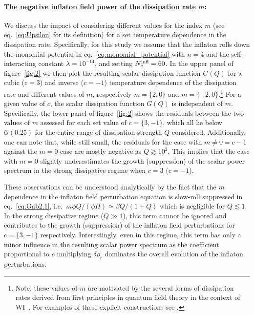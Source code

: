 \documentclass[a4paper,11pt]{article}
\begin{document}
\paragraph{The negative inflaton field power of the dissipation rate $m$:}
We discuss the impact of considering different values for the index $m$ (see eq.~\eqref{eq:Upsilon} for its definition) for a set temperature dependence in the dissipation rate.
Specifically, for this study we assume that the inflaton rolls down the monomial potential in eq.~\eqref{eq:monomial_potential} with $n=4$ and the self-interacting constant $\lambda=10^{-14}$, and setting $N_e^{\rm{infl}} = 60$. In the upper panel of figure~\ref{fig:2} we then plot the resulting scalar dissipation function $G(Q)$ for a cubic ($c=3$) and inverse ($c=-1$) temperature dependence of the dissipation rate and different values of $m$, respectively $m=\{2,0\}$ and $m=\{-2,0\}$.\footnote{Note, these values of $m$ are motivated by the several forms of dissipation rates derived from first principles in quantum field theory in the context of WI~\cite{Kamali:2023lzq}. For examples of these explicit constructions see \cite{Berera:1998gx,Berera:1998px,Bastero-Gil:2012akf,Berghaus:2019whh}.} For a given value of $c$, the scalar dissipation function $G(Q)$ is independent of $m$. Specifically, the lower panel of figure~\ref{fig:2} shows the residuals between the two values of $m$ assessed for each set value of $c=\{3,-1\}$, which all lie below $ \mathcal{O}(0.25)$ for the entire range of dissipation strength $Q$ considered. Additionally, one can note that, while still small, the residuals for the case with $m\neq0=c-1$ against the $m=0$ case are mostly negative as $Q\gtrsim 10^{2}$. This implies that the case with $m=0$ slightly underestimates the growth (suppression) of the scalar power spectrum in the strong dissipative regime when $c=3$ ($c=-1$).

These observations can be understood analytically by the fact that the $m$ dependence in the inflaton field perturbation equation is slow-roll suppressed in eq.~\eqref{eq:Gab2.1}, i.e.\ $m\dot{\phi} Q/(\phi H)\simeq \beta Q/(1+Q)$ which is negligible for $Q\lesssim 1$. In the strong dissipative regime ($Q\gg 1$), this term cannot be ignored and contributes to the growth (suppression) of the inflaton field perturbations for $c=\{3,-1\}$ respectively. Interestingly, even in this regime, this term has only a minor influence in the resulting scalar power spectrum as the coefficient proportional to $c$ multiplying $\delta\hat\rho_r$ dominates the overall evolution of the inflaton perturbations. 
\end{document}
